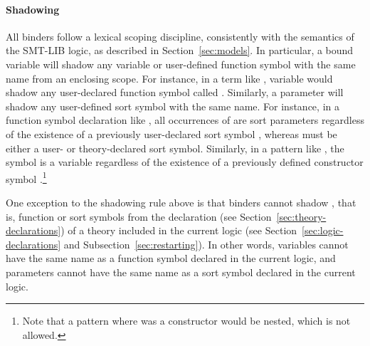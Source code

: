 \paragraph{Shadowing}
All binders follow a lexical scoping discipline, 
consistently with the semantics of the SMT-LIB logic,
as described in Section~\ref{sec:models}.
In particular, a bound variable will shadow any variable or user-defined 
function symbol with the same name from an enclosing scope.
For instance, in a term like
,
variable  would shadow any user-declared function symbol
called .
Similarly, a parameter will shadow any user-defined 
sort symbol with the same name.
For instance, in a function symbol declaration like
,
all occurrences of  are sort parameters regardless of the existence
of a previously user-declared sort symbol , whereas  must
be either a user- or theory-declared sort symbol.
Similarly, in a  pattern like ,
the symbol  is a variable regardless of the existence 
of a previously defined constructor symbol .\footnote{%
Note that a pattern  where  was a constructor
would be nested, which is not allowed. 
}

\begin{remark}
One exception to the shadowing rule above is that binders cannot shadow ,
that is, function or sort symbols from the declaration 
(see Section~\ref{sec:theory-declarations})
of a theory included in the current logic
(see Section~\ref{sec:logic-declarations} and Subsection~\ref{sec:restarting}).
In other words, variables cannot have the same name 
as a function symbol declared in the current logic, and parameters
cannot have the same name as a sort symbol declared in the current logic.
\end{remark}



